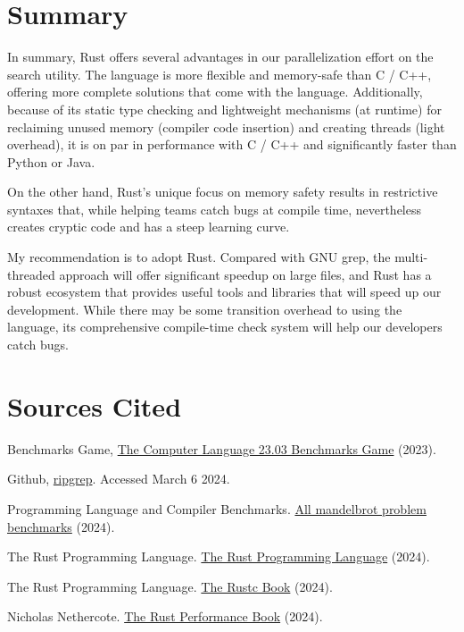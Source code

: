 \section{Summary}
In summary, Rust offers several advantages in our parallelization effort on
the search utility. The language is more flexible and memory-safe than C / 
C++, offering more complete solutions that come with the language. 
Additionally, because of its static type checking and lightweight 
mechanisms (at runtime) for reclaiming unused memory 
(compiler code insertion) and creating threads (light overhead), it is
on par in performance with C / C++ and significantly faster than 
Python or Java.

On the other hand, Rust's unique focus on memory safety results in restrictive 
syntaxes that, while helping teams catch bugs at compile time, nevertheless 
creates cryptic code and has a steep learning curve. 

My recommendation is to adopt Rust. Compared with GNU grep, the multi-threaded
approach will offer significant speedup on large files, and Rust has a robust 
ecosystem that provides useful tools and libraries that will speed up our development.
While there may be some transition overhead to using the language, its comprehensive
compile-time check system will help our developers catch bugs.


\section{Sources Cited}
    Benchmarks Game, \href{https://benchmarksgame-team.pages.debian.net/benchmarksgame/box-plot-summary-charts.html}{The Computer Language 23.03 Benchmarks Game} (2023).
    
    Github, \href{https://github.com/BurntSushi/ripgrep}{ripgrep}. Accessed March 6 2024.
    
    Programming Language and Compiler Benchmarks. \href{https://programming-language-benchmarks.vercel.app/problem/mandelbrot}{All mandelbrot problem benchmarks} (2024).
    
    The Rust Programming Language. \href{https://doc.rust-lang.org/book/}{The Rust Programming Language} (2024).
    
    The Rust Programming Language. \href{https://doc.rust-lang.org/stable/rustc/platform-support.html}{The Rustc Book} (2024).
    
    Nicholas Nethercote. \href{https://nnethercote.github.io/perf-book/io.html}{The Rust Performance Book} (2024).
    
